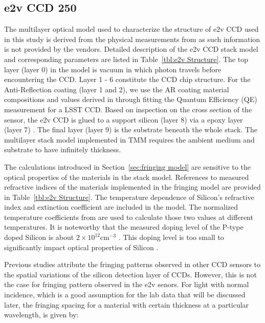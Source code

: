 \documentclass[twocolumn]{aastex63} %
\begin{document}
\begin{CJK*}{UTF8}{gbsn}




\subsection{e2v CCD 250} \label{sec:sensor structure}
The multilayer optical model used to characterize the structure of e2v CCD used in this study is derived from the physical measurements from \citet{Craig19b} as such information is not provided by the vendors. Detailed description of the e2v CCD stack model and corresponding parameters are listed in Table~\ref{tbl:e2v Structure}. The top layer (layer 0) in the model is vacuum in which photon travels before encountering the CCD. Layer 1 - 6 constitute the CCD chip structure. For the Anti-Reflection coating (layer 1 and 2), we use the AR coating material compositions and values derived in \citet{Andy15} through fitting the Quantum Efficiency (QE) measurement for a LSST CCD. Based on inspection on the cross section of the sensor, the e2v CCD is glued to a support silicon (layer 8) via a epoxy layer (layer 7)  \citep{Craig19b}. The final layer (layer 9) is the substrate beneath the whole stack. The multilayer stack model implemented in TMM requires the ambient medium  and substrate to have infinitely thickness. 

The calculations introduced in Section~\ref{sec:fringing model} are sensitive to the optical properties of the materials in the stack model. References to measured refractive indices of the materials implemented in the fringing model are provided in Table~\ref{tbl:e2v Structure}. The temperature dependence of Silicon's refractive index and extinction coefficient are included in the model. The normalized temperature coefficients from \citet{Green08} are used to calculate those two values at different temperatures. It is noteworthy that the measured doping level of the P-type doped Silicon is about $2\times10^{12} \text{cm}^{-3}$ \citep{Craig19b}. This doping level is too small to significantly impact optical properties of Silicon \citep{Jellison81}.


Previous studies \citep{Malumuth03,Walsh03} attribute the fringing patterns observed in other CCD sensors to the spatial variations of the silicon detection layer of CCDs. However, this is not the case for fringing pattern observed in the e2v senors. For light with normal incidence, which is a good assumption for the lab data that will be discussed later, the fringing spacing for a material with certain thickness at a particular wavelength, is given by:


\end{CJK*}
\end{document}
